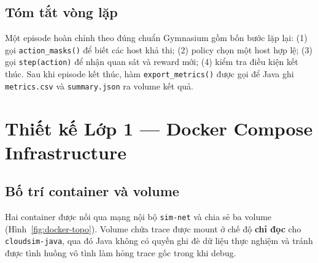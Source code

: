 \subsection{Tóm tắt vòng lặp}
Một episode hoàn chỉnh theo đúng chuẩn Gymnasium gồm bốn bước lặp lại:
(1) gọi \texttt{action\_masks()} để biết các host khả thi; (2) policy
chọn một host hợp lệ; (3) gọi \texttt{step(action)} để nhận quan sát
và reward mới; (4) kiểm tra điều kiện kết thúc. Sau khi episode kết
thúc, hàm \texttt{export\_metrics()} được gọi để Java ghi
\texttt{metrics.csv} và \texttt{summary.json} ra volume kết quả.

\section{Thiết kế Lớp 1 — Docker Compose Infrastructure}
\label{sec:layer-docker}

\subsection{Bố trí container và volume}
Hai container được nối qua mạng nội bộ \texttt{sim-net} và chia sẻ ba
volume (Hình~\ref{fig:docker-topo}). Volume chứa trace được mount ở
chế độ \textbf{chỉ đọc} cho \texttt{cloudsim-java}, qua đó Java không
có quyền ghi đè dữ liệu thực nghiệm và tránh được tình huống vô tình
làm hỏng trace gốc trong khi debug.

